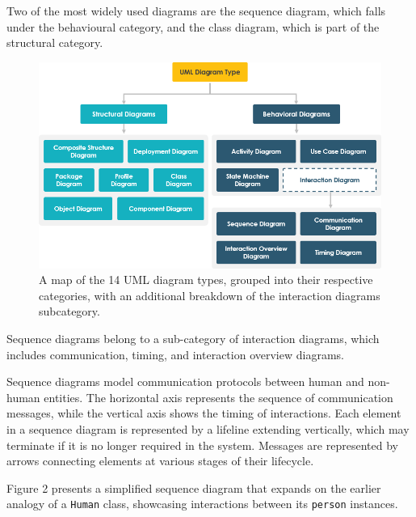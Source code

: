 \documentclass{article}
\newcounter{subsubsubsection}[subsubsection]
\begin{document}
{Two of the most widely used diagrams are the sequence diagram, which falls under the behavioural category, and the class diagram, which is part of the structural category.

\begin{figure}[H]
    \centering
    \includegraphics[width=1.0\linewidth]{01-uml-diagram-types.png}
    \caption{A map of the 14 UML diagram types, grouped into their respective categories, with an additional breakdown of the interaction diagrams subcategory\cite{visualpara}.}
    \label{fig:UML Diagram Map}
\end{figure}


Sequence diagrams belong to a sub-category of interaction diagrams, which includes communication, timing, and interaction overview diagrams\cite{Seidl_Scholz_Huemer_Kappel_Duffy_2014}.

Sequence diagrams model communication protocols between human and non-human entities. The horizontal axis represents the sequence of communication messages, while the vertical axis shows the timing of interactions. Each element in a sequence diagram is represented by a lifeline extending vertically, which may terminate if it is no longer required in the system. Messages are represented by arrows connecting elements at various stages of their lifecycle. 

Figure 2 presents a simplified sequence diagram that expands on the earlier analogy of a \texttt{Human} class, showcasing interactions between its \texttt{person} instances.

}
\end{document}
